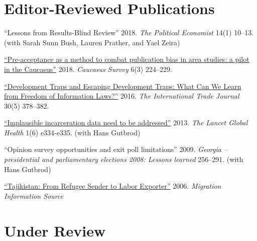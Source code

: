 \section{\sc Editor-Reviewed Publications}

\renewcommand{\labelenumi}{\theenumi.}
\begin{etaremune}

  \item ``Lessons from Results-Blind Review'' 2018. \textit{The Political Economist} 14(1) 10–13. (with Sarah Sunn Bush, Lauren Prather, and Yael Zeira)

  \item \href{https://www.tandfonline.com/doi/full/10.1080/23761199.2018.1522796}{``Pre-acceptance as a method to combat publication bias in area studies: a pilot in the Caucasus''} 2018. \textit{Caucasus Survey} 6(3) 224–229.

  \item \href{https://doi.org/10.1080/08853908.2016.1211571}{``Development Traps and Escaping Development Traps: What Can We Learn from Freedom of Information Laws?''} 2016. \textit{The International Trade Journal} 30(5) 378–382.

  \item \href{https://doi.org/10.1016/s2214-109x(13)70142-6}{``Implausible incarceration data need to be addressed''} 2013. \textit{The Lancet Global Health} 1(6) e334-e335. (with Hans Gutbrod)

  \item ``Opinion survey opportunities and exit poll limitations'' 2009. \textit{Georgia – presidential and parliamentary elections 2008: Lessons learned} 256–291. (with Hans Gutbrod)

  \item \href{https://www.migrationpolicy.org/article/tajikistan-refugee-sender-labor-exporter}{``Tajikistan: From Refugee Sender to Labor Exporter''} 2006. \textit{Migration Information Source}

\end{etaremune}

\section{\sc Under Review}

